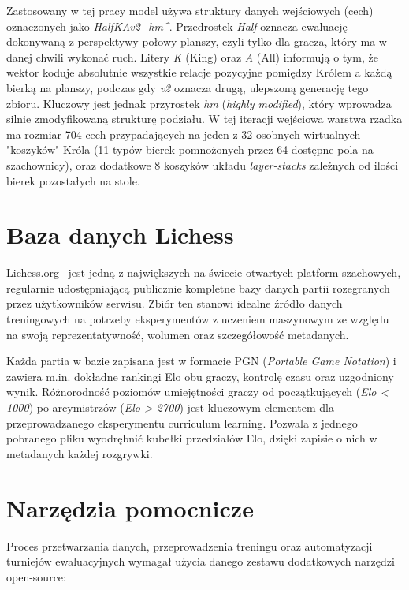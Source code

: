 \documentclass[12pt,a4paper]{report}
\begin{document}
Zastosowany w tej pracy model używa struktury danych wejściowych (cech) oznaczonych jako \textit{HalfKAv2\_hm\string^}. Przedrostek \textit{Half} oznacza ewaluację dokonywaną z perspektywy połowy planszy, czyli tylko dla gracza, który ma w danej chwili wykonać ruch. Litery \textit{K} (King) oraz \textit{A} (All) informują o tym, że wektor koduje absolutnie wszystkie relacje pozycyjne pomiędzy Królem a każdą bierką na planszy, podczas gdy \textit{v2} oznacza drugą, ulepszoną generację tego zbioru. Kluczowy jest jednak przyrostek \textit{hm} (\textit{highly modified}), który wprowadza silnie zmodyfikowaną strukturę podziału. W tej iteracji wejściowa warstwa rzadka ma rozmiar 704 cech przypadających na jeden z 32 osobnych wirtualnych "koszyków" Króla (11 typów bierek pomnożonych przez 64 dostępne pola na szachownicy), oraz dodatkowe 8 koszyków układu \textit{layer-stacks} zależnych od ilości bierek pozostałych na stole.

\section{Baza danych Lichess}

Lichess.org~\cite{lichess} jest jedną z największych na świecie otwartych platform szachowych, regularnie udostępniającą publicznie kompletne bazy danych partii rozegranych przez użytkowników serwisu. Zbiór ten stanowi idealne źródło danych treningowych na potrzeby eksperymentów z uczeniem maszynowym ze względu na swoją reprezentatywność, wolumen oraz szczegółowość metadanych.

Każda partia w bazie zapisana jest w formacie PGN (\textit{Portable Game Notation}) i zawiera m.in. dokładne rankingi Elo obu graczy, kontrolę czasu oraz uzgodniony wynik. Różnorodność poziomów umiejętności graczy od początkujących (\textit{Elo < 1000}) po arcymistrzów (\textit{Elo > 2700}) jest kluczowym elementem dla przeprowadzanego eksperymentu curriculum learning. Pozwala z jednego pobranego pliku wyodrębnić kubełki przedziałów Elo, dzięki zapisie o nich w metadanych każdej rozgrywki.

\section{Narzędzia pomocnicze}

Proces przetwarzania danych, przeprowadzenia treningu oraz automatyzacji turniejów ewaluacyjnych wymagał użycia danego zestawu dodatkowych narzędzi open-source:
\end{document}
